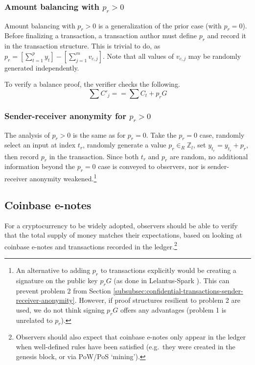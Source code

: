 \subsubsection{Amount balancing with $p_r > 0$}

Amount balancing with $p_r > 0$ is a generalization of the prior case (with $p_r = 0$). Before finalizing a transaction, a transaction author must define $p_r$ and record it in the transaction structure. This is trivial to do, as $p_r = [\sum^{p}_{t=1} y_t] - [\sum^{m}_{j=1} v_{c,j}]$. Note that all values of $v_{c,j}$ may be randomly generated independently.

To verify a balance proof, the verifier checks the following.\vspace{.115cm}
\[\sum C'_j == \sum C_t + p_r G\]

\subsubsection{Sender-receiver anonymity for $p_r > 0$}

The analysis of $p_r > 0$ is the same as for $p_r = 0$. Take the $p_r = 0$ case, randomly select an input at index $t_r$, randomly generate a value $p_r \in_R \mathbb{Z}_l$, set $y_{t_r} = y_{t_r} + p_r$, then record $p_r$ in the transaction. Since both $t_r$ and $p_r$ are random, no additional information beyond the $p_r = 0$ case is conveyed to observers, nor is sender-receiver anonymity weakened.\footnote{An alternative to adding $p_r$ to transactions explicitly would be creating a signature on the public key $p_r G$ (as done in Lelantus-Spark \cite{lelantus-spark}). This can prevent problem 2 from Section \ref{subsubsec:confidential-transactions-sender-receiver-anonymity}. However, if proof structures resilient to problem 2 are used, we do not think signing $p_r G$ offers any advantages (problem 1 is unrelated to $p_r$).}


\subsection{Coinbase e-notes}
\label{subsec:implementers-coinbase-enotes}

For a cryptocurrency to be widely adopted, observers should be able to verify that the total supply of money matches their expectations, based on looking at coinbase e-notes and transactions recorded in the ledger.\footnote{Observers should also expect that coinbase e-notes only appear in the ledger when well-defined rules have been satisfied (e.g.\ they were created in the genesis block, or via PoW/PoS `mining').}

